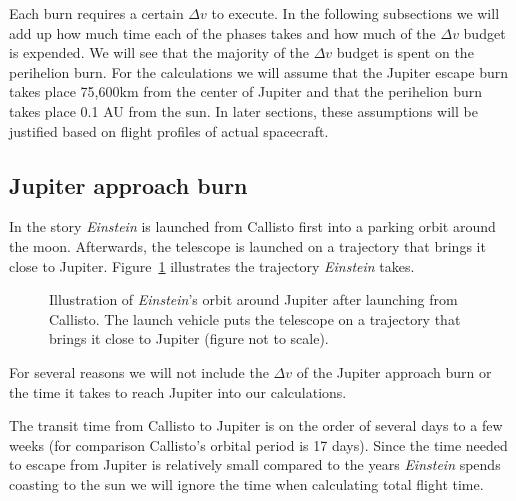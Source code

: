 \documentclass[12pt]{article} %
\begin{document}
Each burn requires a certain $\Delta v$ to execute. In the following subsections we will add up how much time each of the phases takes and how much of the $\Delta v$ budget is expended. We will see that the majority of the $\Delta v$ budget is spent on the perihelion burn. For the calculations we will assume that the Jupiter escape burn takes place 75,600km from the center of Jupiter and that the perihelion burn takes place 0.1 AU from the sun. In later sections, these assumptions will be justified based on flight profiles of actual spacecraft.

\subsection{Jupiter approach burn}
In the story \textit{Einstein} is launched from Callisto first into a parking orbit around the moon. Afterwards, the telescope is launched on a trajectory that brings it close to Jupiter. Figure~\ref{fig:jupiterapproach} illustrates the trajectory \textit{Einstein} takes.

\begin{figure}[H]
	\caption{Illustration of \textit{Einstein}'s orbit around Jupiter after launching from Callisto. The launch vehicle puts the telescope on a trajectory that brings it close to Jupiter (figure not to scale).}
	\label{fig:jupiterapproach}
\end{figure}

For several reasons we will not include the $\Delta v$ of the Jupiter approach burn or the time it takes to reach Jupiter into our calculations.

The transit time from Callisto to Jupiter is on the order of several days to a few weeks (for comparison Callisto's orbital period is 17 days). Since the time needed to escape from Jupiter is relatively small compared to the years \textit{Einstein} spends coasting to the sun we will ignore the time when calculating total flight time.
\end{document}
